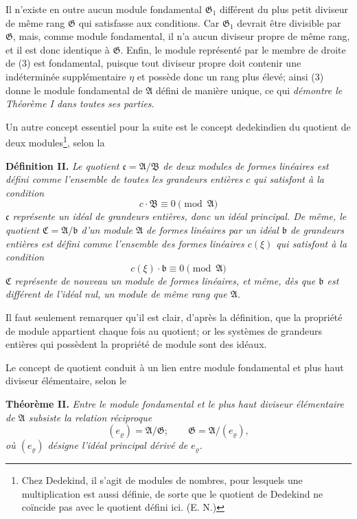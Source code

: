 \documentclass[11pt]{article}
\providecommand{\Amod}{\mathfrak A}
\providecommand{\Bmod}{\mathfrak B}
\providecommand{\Gmod}{\mathfrak G}
\providecommand{\bb}{\mathfrak b}
\providecommand{\cc}{\mathfrak c}
\providecommand{\zero}[1]{\equiv 0\pmod{#1}}
\begin{document}
Il n'existe en outre aucun module fondamental $\Gmod_1$ différent du plus petit diviseur de même rang $\Gmod$ qui satisfasse aux conditions. Car $\Gmod_1$ devrait être divisible par $\Gmod$, mais, comme module fondamental, il n'a aucun diviseur propre de même rang, et il est donc identique à $\Gmod$. Enfin, le module représenté par le membre de droite de (3) est fondamental, puisque tout diviseur propre doit contenir une indéterminée supplémentaire $\eta$ et possède donc un rang plus élevé; ainsi (3) donne le module fondamental de $\Amod$ défini de manière unique, ce qui \emph{démontre le Théorème I dans toutes ses parties}.

Un autre concept essentiel pour la suite est le concept dedekindien du quotient de deux modules\footnote{Chez Dedekind, il s'agit de modules de nombres, pour lesquels une multiplication est aussi définie, de sorte que le quotient de Dedekind ne coïncide pas avec le quotient défini ici. (E. N.)}, selon la

\medskip
\noindent\textbf{Définition II.} \emph{Le quotient $\cc=\Amod/\Bmod$ de deux modules de formes linéaires est défini comme l'ensemble de toutes les grandeurs entières $c$ qui satisfont à la condition}
\[
 c\cdot\Bmod\zero{\Amod}
\]
\emph{$\cc$ représente un idéal de grandeurs entières, donc un idéal principal. De même, le quotient $\mathfrak C=\Amod/\bb$ d'un module $\Amod$ de formes linéaires par un idéal $\bb$ de grandeurs entières est défini comme l'ensemble des formes linéaires $c(\xi)$ qui satisfont à la condition}
\[
 c(\xi)\cdot\bb\zero{\Amod}
\]
\emph{$\mathfrak C$ représente de nouveau un module de formes linéaires, et même, dès que $\bb$ est différent de l'idéal nul, un module de même rang que $\Amod$.}

Il faut seulement remarquer qu'il est clair, d'après la définition, que la propriété de module appartient chaque fois au quotient; or les systèmes de grandeurs entières qui possèdent la propriété de module sont des idéaux.

Le concept de quotient conduit à un lien entre module fondamental et plus haut diviseur élémentaire, selon le

\medskip
\noindent\textbf{Théorème II.} \emph{Entre le module fondamental et le plus haut diviseur élémentaire de $\Amod$ subsiste la relation réciproque}
\begin{equation}
 (e_\varrho)=\Amod/\Gmod;\qquad \Gmod=\Amod/(e_\varrho),
\tag{5}
\end{equation}
\emph{où $(e_\varrho)$ désigne l'idéal principal dérivé de $e_\varrho$.}
\end{document}
